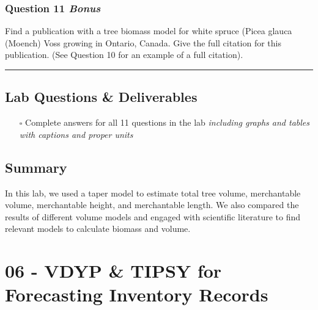 \documentclass[
  letterpaper,
]{book}
\providecommand{\tightlist}{%
  \setlength{\itemsep}{0pt}\setlength{\parskip}{0pt}}\usepackage{longtable,booktabs,array}
\begin{document}
\hypertarget{question-11-bonus}{%
\subsection*{\texorpdfstring{\textbf{Question 11}
\emph{Bonus}}{Question 11 Bonus}}\label{question-11-bonus}}

Find a publication with a tree biomass model for white spruce (Picea
glauca (Moench) Voss growing in Ontario, Canada. Give the full citation
for this publication. (See Question 10 for an example of a full
citation).

\begin{center}\rule{0.5\linewidth}{0.5pt}\end{center}

\hypertarget{lab-questions-deliverables-4}{%
\section*{Lab Questions \&
Deliverables}\label{lab-questions-deliverables-4}}


\begin{itemize}
\tightlist
\item[$\square$]
  Complete answers for all 11 questions in the lab \emph{including
  graphs and tables with captions and proper units}
\end{itemize}

\hypertarget{summary-4}{%
\section*{Summary}\label{summary-4}}


In this lab, we used a taper model to estimate total tree volume,
merchantable volume, merchantable height, and merchantable length. We
also compared the results of different volume models and engaged with
scientific literature to find relevant models to calculate biomass and
volume.


\hypertarget{vdyp-tipsy-for-forecasting-inventory-records}{%
\chapter{06 - VDYP \& TIPSY for Forecasting Inventory
Records}\label{vdyp-tipsy-for-forecasting-inventory-records}}
\end{document}
